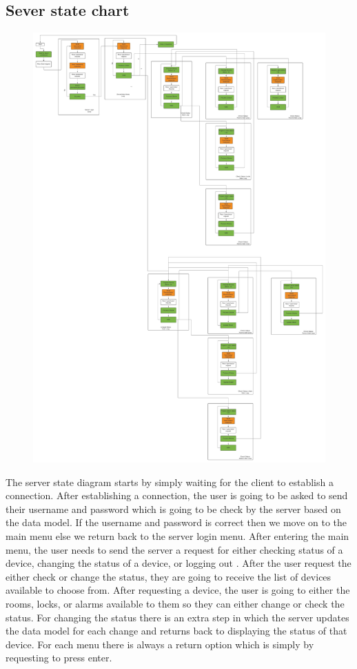 \documentclass[11pt]{article}
\begin{document}
		\subsection*{Sever state chart}
			\begin{figure}[H]
				\centering
				\includegraphics[scale=0.5]{server_state_diagram}
				\label{fig:serverstatediagram}
			\end{figure}
		The server state diagram starts by simply waiting for the client to establish a connection. After establishing a connection, the user is going to be asked to send their username and password which is going to be check by the server based on the data model. If the username and password is correct then we move on to the main menu else we return back to the server login menu. After entering the main menu, the user needs to send the server a request for either checking status of a device, changing the status of a device, or logging out . After the user request the either check or change the status, they are going to receive the list of devices available to choose from. After requesting a device, the user is going to either the rooms, locks, or alarms available to them so they can either change or check the status. For changing the status there is an extra step in which the server updates the data model for each change and returns back to displaying the status of that device. For each menu there is always a return option which is simply by requesting to press enter. 
\end{document}

